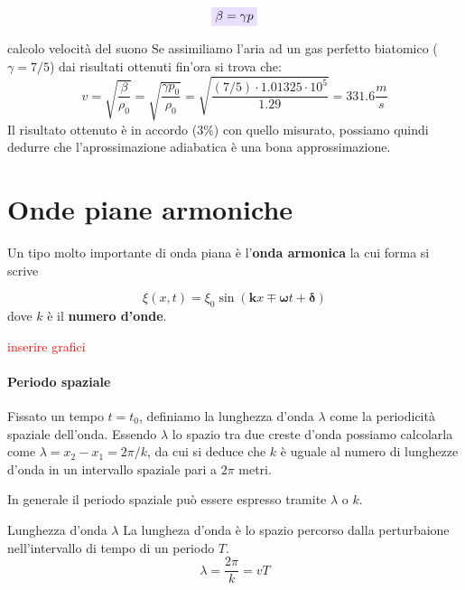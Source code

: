 \documentclass[x11names]{article}
\newcommand{\viola}[1]{\colorbox{myred}{$\displaystyle #1$}}
\begin{document}
	
	\begin{equation}
		\viola{\beta = \gamma p}
	\end{equation}
	
	\begin{es}{calcolo velocità del suono}
		Se assimiliamo l'aria ad un gas perfetto biatomico (\(\gamma = 7/5\)) dai risultati ottenuti fin'ora si trova che:
		\[ 
		v = \sqrt{\frac{\beta}{\rho_0}} = \sqrt{\frac{\gamma p_0}{\rho_0}} = \sqrt{\frac{(7/5)\cdot 1.01325\cdot 10^5}{1.29}} = 331.6 \frac{m}{s}
		\]
		Il risultato ottenuto è in accordo (3\%) con quello misurato, possiamo quindi dedurre che l'aprossimazione adiabatica è una bona approssimazione.
	\end{es}
	
	
\newpage
\section{Onde piane armoniche}
Un tipo molto importante di onda piana è l'\textbf{onda armonica} la cui forma si scrive

\[ 
\xi(x,t) = \xi_0 \sin\left(\boldsymbol{k}x \mp \boldsymbol{\omega} t + \boldsymbol{\delta}\right)
\]
dove \(k\) è il \textbf{numero d'onde}.
\begin{center}
	\textcolor{red}{inserire grafici}
\end{center}

\noindent
\paragraph{Periodo spaziale} Fissato un tempo \(t=t_0\), definiamo la lunghezza d'onda \(\lambda\) come la periodicità spaziale dell'onda. Essendo \(\lambda\) lo spazio tra due creste d'onda possiamo calcolarla come \(\lambda = x_2 - x_1 = 2\pi / k\), da cui si deduce che \(k\) è uguale al numero di lunghezze d'onda in un intervallo spaziale pari a \(2\pi\) metri.

In generale il periodo spaziale può essere espresso tramite \(\lambda\) o \(k\).

\begin{center}
	\colorbox{myblue}{\begin{minipage}{5.75in}
			\begin{blues}{Lunghezza d'onda \(\lambda\)}
				La lungheza d'onda è lo spazio percorso dalla perturbaione nell'intervallo di tempo di un periodo \(T\).
				\[ 
				\lambda = \frac{2\pi}{k} = vT
				\]
			\end{blues}
	\end{minipage}}
\end{center}
\end{document}
